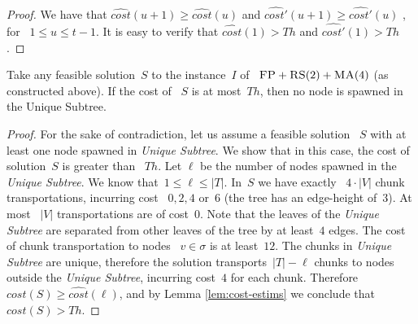 \documentclass[preprint,12pt]{elsarticle}
\newcommand{\FP}{\textsc{FP}}
\newcommand{\RS}{\textsc{RS}}
\newcommand{\MA}{\textsc{MA}}
\newcommand{\Solution}{S}
\newcommand{\CostSol}{\textit{cost}(\Solution)}
\newcommand{\CostEstimOne}{\widehat{cost}}
\newcommand{\CostEstimTwo}{\widehat{cost'}}
\newcommand{\numNodes}{\ensuremath{|V|}}
\newcommand{\UnqSubtree}{{{\emph{Unique Subtree}}}}
\newcommand{\SpawnedUnqSubtree}{\sigma}
\newcommand{\Thr}{\ensuremath{Th}}
\begin{document}
\begin{proof}
  We have that $\CostEstimOne(u+1) \geq \CostEstimOne(u)$ and $\CostEstimTwo(u+1) \geq \CostEstimTwo(u)$ , for
 ~$1\leq u \leq t-1$. It is easy to verify that $\CostEstimOne(1) > \Thr$ and $\CostEstimTwo(1) > \Thr$.
\end{proof}

\begin{lemma}
  Take any feasible solution~$\Solution$ to the instance~$I$ of
 ~$\FP+\RS(2)+\MA(4)$ (as constructed above). If the cost of
 ~$\Solution$ is at most~$\Thr$, then no node is spawned in the Unique
  Subtree.
  \label{th:no-unique}
\end{lemma}

\begin{proof}
  For the sake of contradiction, let us assume a feasible solution
 ~$\Solution$ with at least one node spawned in {\UnqSubtree}. We show
  that in this case, the cost of solution~$\Solution$ is greater than
 ~$\Thr$. Let $\ell$ be the number of nodes spawned in the {\UnqSubtree}. We know
  that~$1 \leq \ell \leq |T|$.  In~$\Solution$ we have exactly
 ~$4 \cdot \numNodes$ chunk transportations, incurring cost
 ~$0, 2, 4$ or~$6$ (the tree has an edge-height of~$3$). At most
 ~$\numNodes$ transportations are of cost~$0$. Note that the leaves of the
  {\UnqSubtree} are separated from other leaves of the tree by at
  least~$4$ edges.  The cost of chunk transportation to nodes
 ~$v \in \SpawnedUnqSubtree$ is at least~$12$. The chunks in
  {\UnqSubtree} are unique, therefore the solution transports~$|T| - \ell$
  chunks to nodes outside the \UnqSubtree, incurring cost~$4$ for each
  chunk.
  Therefore $\CostSol \geq \CostEstimOne(\ell)$, and by Lemma \ref{lem:cost-estims}
  we conclude that $\CostSol > \Thr$.
\end{proof}
\end{document}
